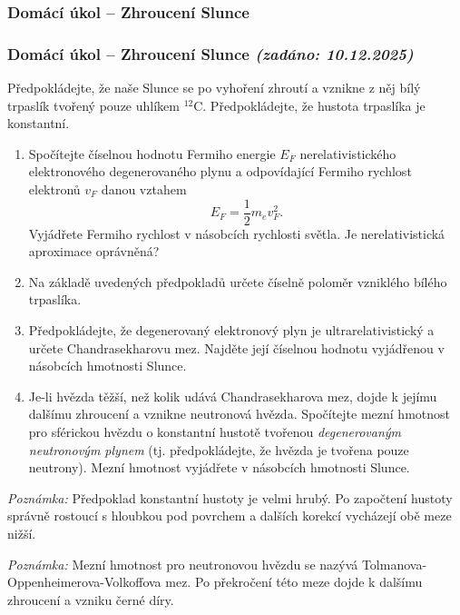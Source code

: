 \documentclass[a4paper,11pt,twoside]{article}
\newenvironment{homework}{}{}
\newcommand{\np}{\clearpage\newpage}
\newcommand{\exercise}[2][]{\ifthenelse{\isempty{#1}}
	{\np\thispagestyle{empty}\subsubsection*{Domácí úkol -- #2}}
	{\np\thispagestyle{empty}\np\subsubsection*{Domácí úkol -- #2 \small{\it{(zadáno: {#1})}}}}
}
\begin{document}
\begin{homework}
	\exercise[10.12.2025]{Zhroucení Slunce}
		Předpokládejte, že naše Slunce se po vyhoření zhroutí a vznikne z něj bílý trpaslík tvořený pouze uhlíkem $^{12}\mathrm{C}$.  
		Předpokládejte, že hustota trpaslíka je konstantní.

		\begin{enumerate}
			\item Spočítejte číselnou hodnotu Fermiho energie $E_{F}$ nerelativistického elektronového degenerovaného plynu a odpovídající Fermiho rychlost elektronů $v_{F}$ danou vztahem
			\begin{equation*}
				E_{F}=\frac{1}{2}m_{e}v_{F}^{2}.
			\end{equation*}
			Vyjádřete Fermiho rychlost v násobcích rychlosti světla.
			Je nerelativistická aproximace oprávněná?
			
			\item Na základě uvedených předpokladů určete číselně poloměr vzniklého bílého trpaslíka.

			\item Předpokládejte, že degenerovaný elektronový plyn je ultrarelativistický a určete Chandrasekharovu mez.
				Najděte její číselnou hodnotu vyjádřenou v násobcích hmotnosti Slunce.
			
			\item Je-li hvězda těžší, než kolik udává Chandrasekharova mez, dojde k jejímu dalšímu zhroucení a vznikne neutronová hvězda.
			Spočítejte mezní hmotnost pro sférickou hvězdu o konstantní hustotě tvořenou \emph{degenerovaným neutronovým plynem} (tj. předpokládejte, že hvězda je tvořena pouze neutrony). 
			Mezní hmotnost vyjádřete v násobcích hmotnosti Slunce.
		\end{enumerate}

		{\it Poznámka:} Předpoklad konstantní hustoty je velmi hrubý. 
		Po započtení hustoty správně rostoucí s hloubkou pod povrchem a dalších korekcí vycházejí obě meze nižší.

		{\it Poznámka:} Mezní hmotnost pro neutronovou hvězdu se nazývá Tolmanova-Oppenheimerova-Volkoffova mez.
		Po překročení této meze dojde k dalšímu zhroucení a vzniku černé díry.

		\newpage
\end{homework}
\end{document}
